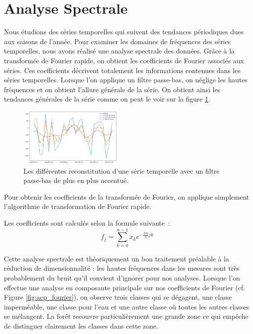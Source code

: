 \documentclass[twocolumn,10pt]{article}
\begin{document}
\section{Analyse Spectrale} 

Nous étudions des séries temporelles qui suivent des tendances périodiques dues aux saisons de l'année. Pour examiner les domaines de fréquences des séries temporelles, nous avons réalisé une analyse spectrale des données.
Grâce à la transformée de Fourier rapide, on obtient les coefficients de Fourier associés aux séries. Ces coefficients décrivent totalement les informations contenues dans les séries temporelles. Lorsque l'on applique un filtre passe-bas, on néglige les hautes fréquences et on obtient l'allure générale de la série. On obtient ainsi les tendances générales de la série comme on peut le voir sur la figure \ref{fig:fourier}.
\begin{figure}[htbp]
\begin{center}
\includegraphics[width=0.45\textwidth]{figures/ift.png}
\caption{\label{fig:fourier}Les différentes reconstitution d'une série temporelle avec un filtre passe-bas de plus en plus accentué.}
\end{center}
\end{figure}

Pour obtenir les coefficients de la transformée de Fourier, on applique simplement l'algorithme de transformation de Fourier rapide.

Les coefficients sont calculés selon la formule suivante~:
\[
f_j =  \sum_{k=0}^{n-1} x_k e^{-\frac{2\pi i}{n} jk }
\]

Cette analyse spectrale est théoriquement un bon traitement préalable à la réduction de dimensionnalité : les hautes fréquences dans les mesures sont très probablement du bruit qu'il convient d'ignorer pour nos analyses. Lorsque l'on effectue une analyse en composante principale sur nos coefficients de Fourier (cf. Figure \ref{fig:acp_fourier}), on observe trois classes qui se dégagent, une classe imperméable, une classe pour l'eau et une autre classe où toutes les autres classes se mélangent. La forêt recouvre particulièrement une grande zone ce qui empêche de distinguer clairement les classes dans cette zone.
\end{document}
